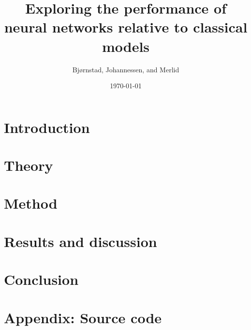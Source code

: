 \documentclass[aps,rmp,reprint,amsmath,amssymb,twocolumn,floatfix]{revtex4-1}
\begin{document}
\title{Exploring the performance of neural networks relative to classical models}

\author{Bjørnstad, Johannessen, and Merlid}
\date{\today}


\begin{abstract}

\end{abstract}
\maketitle

\tableofcontents

\section{Introduction}
\label{sec:introduction}

\section{Theory}


\section{Method}


\section{Results and discussion}


%

\section{Conclusion}


\clearpage
{} %


\clearpage
\appendix
\section{Appendix: Source code}
\label{appendix}

\clearpage
\end{document}
